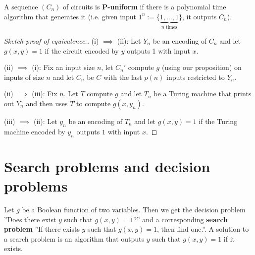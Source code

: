 \documentclass{article}
\theoremstyle{definition}
\begin{document}
A sequence $(C_n)$ of circuits is \textbf{P-uniform} if there is a polynomial time algorithm that generates it (i.e. given input $1^n := \{\underbrace{1,\ldots,1}_{n \text{ times}}\}$, it outputs $C_n$).
\begin{proof}[Sketch proof of equivalence.]
    (i) $\implies $ (ii): Let $Y_n$ be an encoding of $C_n$ and let $g(x,y)=1$ if the circuit encoded by $y$ outputs 1 with input $x$.
    \vspace{1mm}
     
    (ii) $\implies $ (i): Fix an input size $n$, let $C_n'$ compute $g$ (using our proposition) on inputs of size $n$ and let $C_n$ be $C$ with the last $p(n)$ inputs restricted to $Y_n$.
    \vspace{1mm}
     
    (ii) $\implies $ (iii): Fix $n$. Let $T$ compute $g$ and let $T_n$ be a Turing machine that prints out $Y_n$ and then uses $T$ to compute $g(x,y_n)$.
    \vspace{1mm}
     
    (iii) $\implies $ (ii): Let $y_n$ be an encoding of $T_n$ and let $g(x,y)=1$ if the Turing machine encoded by $y_n$ outputs $1$ with input $x$.
\end{proof}
\section{Search problems and decision problems}
Let $g$ be a Boolean function of two variables. Then we get the decision problem ''Does there exist $y$ such that $g(x,y)=1$?'' and a corresponding \textbf{search problem} ''If there exists $y$ such that $g(x,y)=1$, then find one.''. A solution to a search problem is an algorithm that outputs $y$ such that $g(x,y)=1$ if it exists. 
\end{document}
